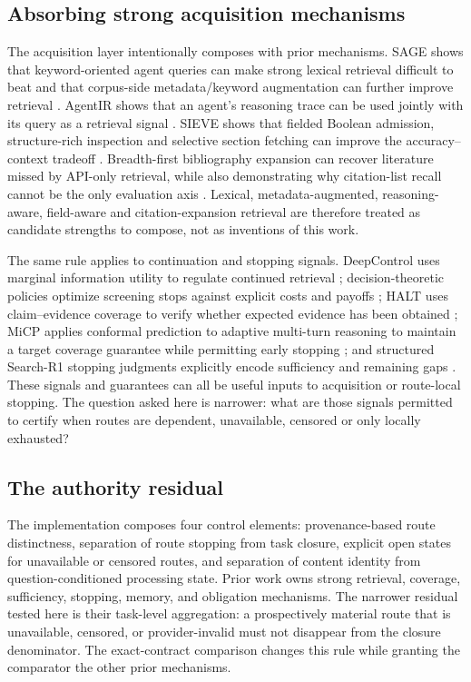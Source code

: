 \subsection{Absorbing strong acquisition mechanisms}

The acquisition layer intentionally composes with prior mechanisms. SAGE shows that
keyword-oriented agent queries can make strong lexical retrieval difficult to
beat and that corpus-side metadata/keyword augmentation can further improve
retrieval \cite{sage2026}.  AgentIR shows that an agent's reasoning trace can be
used jointly with its query as a retrieval signal \cite{agentir2026}.  SIEVE
shows that fielded Boolean admission, structure-rich inspection and selective
section fetching can improve the accuracy--context tradeoff
\cite{sieve2026}.  Breadth-first bibliography expansion can recover literature
missed by API-only retrieval, while also demonstrating why citation-list recall
cannot be the only evaluation axis \cite{rethinkinglitsearch2026}.  Lexical,
metadata-augmented, reasoning-aware, field-aware and citation-expansion
retrieval are therefore treated as candidate strengths to compose, not as
inventions of this work.

The same rule applies to continuation and stopping signals.  DeepControl uses
marginal information utility to regulate continued retrieval
\cite{deepcontrol2026}; decision-theoretic policies optimize screening stops
against explicit costs and payoffs \cite{decisionstop2026}; HALT uses
claim--evidence coverage to verify whether expected evidence has been obtained
\cite{halt2026}; MiCP applies conformal prediction to adaptive multi-turn
reasoning to maintain a target coverage guarantee while permitting early stopping
\cite{micp2026}; and structured Search-R1 stopping judgments explicitly encode
sufficiency and remaining gaps \cite{multiragstop2026}.  These signals and
guarantees can all be useful inputs to acquisition or route-local stopping.  The
question asked here is narrower: what are those signals permitted to certify
when routes are dependent, unavailable, censored or only locally exhausted?

\subsection{The authority residual}

The implementation composes four control elements: provenance-based route
distinctness, separation of route stopping from task closure, explicit open
states for unavailable or censored routes, and separation of content identity
from question-conditioned processing state. Prior work owns strong retrieval,
coverage, sufficiency, stopping, memory, and obligation mechanisms. The narrower
residual tested here is their task-level aggregation: a prospectively material
route that is unavailable, censored, or provider-invalid must not disappear
from the closure denominator. The exact-contract comparison changes this rule
while granting the comparator the other prior mechanisms.

